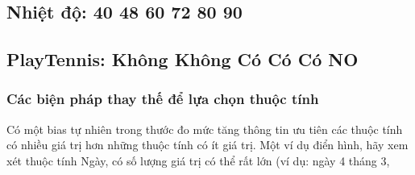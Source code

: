 \subsection{Nhiệt độ: 40 48 60 72 80 90}

\subsection{PlayTennis: Không Không Có Có Có NO}

\subsubsection{Các biện pháp thay thế để lựa chọn thuộc tính}

Có một bias tự nhiên trong thước đo mức tăng thông tin ưu tiên các thuộc tính có nhiều giá trị hơn những thuộc tính có ít giá trị. Một ví dụ điển hình, hãy xem xét thuộc tính Ngày, có số lượng giá trị có thể rất lớn (ví dụ: ngày 4 tháng 3,

